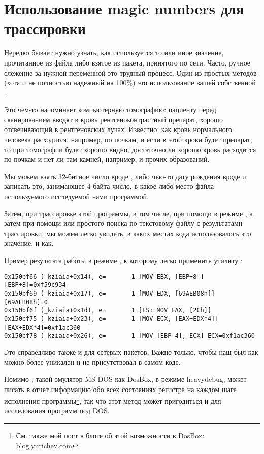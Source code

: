\section{Использование magic numbers для трассировки}

Нередко бывает нужно узнать, как используется то или иное значение, прочитанное из файла либо взятое из пакета,
принятого по сети. Часто, ручное слежение за нужной переменной это трудный процесс. Один из простых методов (хотя и не
полностью надежный на 100\%) это использование вашей собственной .

Это чем-то напоминает компьютерную томографию: пациенту перед сканированием вводят в кровь 
рентгеноконтрастный препарат, хорошо отсвечивающий в рентгеновских лучах.
Известно, как кровь нормального человека
расходится, например, по почкам, и если в этой крови будет препарат, то при томографии будет хорошо видно,
достаточно ли хорошо кровь расходится по почкам и нет ли там камней, например, и прочих образований.

Мы можем взять 32-битное число вроде , либо чью-то дату рождения вроде  
и записать это, занимающее 4 байта число, в какое-либо место файла используемого исследуемой нами программой.

\myindex{\GrepUsage}
Затем, при трассировке этой программы, в том числе, при помощи \tracer в режиме 
, а затем при помощи
 или простого поиска по текстовому файлу с результатами трассировки, мы можем легко увидеть, в каких местах кода использовалось 
это значение, и как.

Пример результата работы \tracer в режиме , к которому легко применить утилиту :

\begin{lstlisting}[style=customasmx86]
0x150bf66 (_kziaia+0x14), e=       1 [MOV EBX, [EBP+8]] [EBP+8]=0xf59c934 
0x150bf69 (_kziaia+0x17), e=       1 [MOV EDX, [69AEB08h]] [69AEB08h]=0 
0x150bf6f (_kziaia+0x1d), e=       1 [FS: MOV EAX, [2Ch]] 
0x150bf75 (_kziaia+0x23), e=       1 [MOV ECX, [EAX+EDX*4]] [EAX+EDX*4]=0xf1ac360 
0x150bf78 (_kziaia+0x26), e=       1 [MOV [EBP-4], ECX] ECX=0xf1ac360 
\end{lstlisting}
Это справедливо также и для сетевых пакетов.
Важно только, чтобы наш  был как можно более уникален и не присутствовал в самом коде.

\newcommand{\DOSBOXURL}{\href{http://go.yurichev.com/17222}{blog.yurichev.com}}

Помимо \tracer, такой эмулятор MS-DOS как DosBox, в режиме heavydebug, может писать в отчет информацию обо всех
состояниях регистра на каждом шаге исполнения программы\footnote{См. также мой пост в блоге об этой возможности в 
DosBox: \DOSBOXURL{}}, так что этот метод может пригодиться и для исследования программ под DOS.

